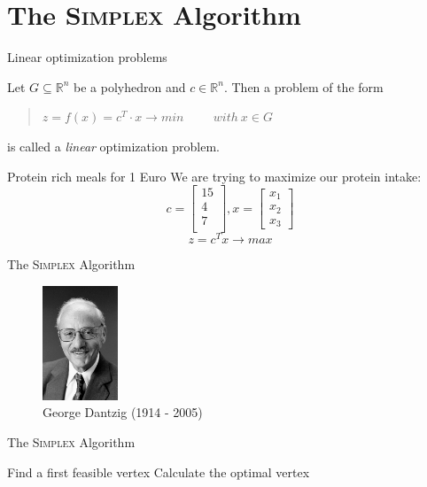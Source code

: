 \documentclass[10pt]{beamer}
\begin{document}
\section{The \textsc{Simplex} Algorithm}
\begin{frame}{Linear optimization problems}
	\begin{definition}
		Let $ G \subseteq \mathbb{R}^n$ be a polyhedron and $ c \in \mathbb{R}^n$. Then a problem of the form \\
		\vspace{0.15cm}
		\begin{quotation}
			$ z = f(x) = c^T \cdot x \rightarrow min\hspace{1cm} with\ x \in G$
		\end{quotation} 
		is called a \emph{linear} optimization problem.
	\end{definition}
	\pause 
	\begin{exampleblock}{Protein rich meals for 1 Euro}
		We are trying to maximize our protein intake:
		\begin{equation*}
			c =
			\begin{bmatrix}
			15\\4\\7\\
			\end{bmatrix},
			x = \begin{bmatrix}
				x_1\\x_2\\x_3
			\end{bmatrix}
		\end{equation*}
		\begin{equation*}
			z = c^Tx \rightarrow max
		\end{equation*}
	\end{exampleblock}
\end{frame}

\begin{frame}{The \textsc{Simplex} Algorithm}
	\begin{figure}[ht]
		\centering
		\includegraphics[width = 0.2\textwidth]{George_Dantzig.jpg}
		\caption{George Dantzig (1914 - 2005)}
	\end{figure}

	\begin{algorithm}[H]
		\caption{The \textsc{Simplex} Algorithm}
		\label{alg:seq}
		\begin{algorithmic}[1]
			\STATE Find a first feasible vertex
			\STATE Calculate the optimal vertex
		\end{algorithmic}
	\end{algorithm}
\end{frame}
\end{document}
